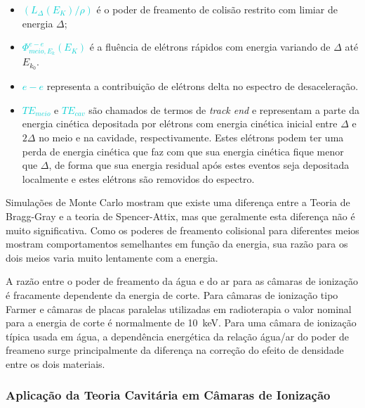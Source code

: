 \documentclass[11pt,a4paper]{article}
\newcounter{exemplo}
\begin{document}
			\begin{exemplo}[onde,]
				
			
			\begin{itemize}
				\item \textcolor{DarkTurquoise}{$(L_{\Delta}(E_K)/\rho)$} é o poder de freamento de colisão restrito com limiar de energia $\Delta$; \\
				\item \textcolor{DarkTurquoise}{$\Phi_{meio, E_k}^{e-e}(E_K)$} é a fluência de elétrons rápidos com energia variando de $\Delta$ até $E_{k_0}$.
				\item \textcolor{DarkTurquoise}{$e-e$} representa a contribuição de elétrons delta no espectro de desaceleração.
				\item \textcolor{DarkTurquoise}{$TE_{meio}$} e \textcolor{DarkTurquoise}{$TE_{cav}$} são chamados de termos de \textit{track end} e representam a parte da energia cinética depositada por elétrons com energia cinética inicial entre $\Delta$ e $2\Delta$ no meio e na cavidade, respectivamente. Estes elétrons podem ter uma perda de energia cinética que faz com que sua energia cinética fique menor que $\Delta$, de forma que sua energia residual após estes eventos seja depositada localmente e estes elétrons são removidos do espectro. 
			\end{itemize}
			\end{exemplo}

			Simulações de Monte Carlo mostram que existe uma diferença entre a Teoria de Bragg-Gray e a teoria de Spencer-Attix, mas que geralmente esta diferença não é muito significativa. Como os poderes de freamento colisional para diferentes meios mostram comportamentos semelhantes em função da energia, sua razão para os dois meios varia muito lentamente com a energia. 

			A razão entre o poder de freamento da água e do ar para as câmaras de ionização é fracamente dependente da energia de corte. Para câmaras de ionização tipo Farmer e câmaras de placas paralelas utilizadas em radioterapia o valor nominal para a energia de corte é normalmente de \qty{10}{keV}. Para uma câmara de ionização típica usada em água, a dependência energética da relação água/ar do poder de freameno surge principalmente da diferença na correção do efeito de densidade entre os dois materiais.


		\subsubsection*{Aplicação da Teoria Cavitária em Câmaras de Ionização}
\end{document}
